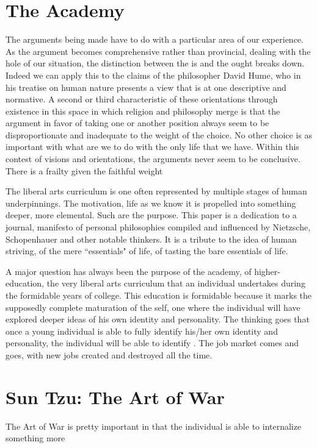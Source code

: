 \documentclass[12pt,letterpaper]{article}
\begin{document}
\section{The Academy}

The arguments being made have to do with a particular area of our experience.  As the argument becomes comprehensive rather than provincial, dealing with the hole of our situation, the distinction between the is and the ought breaks down.  Indeed we can apply this to the claims of the philosopher David Hume, who in his treatise on human nature presents a view that is at one descriptive and normative.  A second or third characteristic of these orientations through existence in this space in which religion and philosophy merge is that the argument in favor of taking one or another position always seem to be disproportionate and inadequate to the weight  of the choice.  No other choice is as important with what are we to do with the only life that we have.  Within this contest of visions and orientations, the arguments never seem to be conclusive.  There is a frailty given the faithful weight 


The liberal arts curriculum is one often represented by multiple stages of human underpinnings.  The motivation, life as we know it is propelled into something deeper, more elemental.  Such are the purpose.  This paper is a dedication to a journal, manifesto of personal philosophies compiled and influenced by Nietzsche, Schopenhauer and other notable thinkers.  It is a tribute to the idea of human striving, of the mere ``essentials" of life, of tasting the bare essentials of life.

A major question has always been the purpose of the academy, of higher-education, the very liberal arts curriculum that an individual undertakes during the formidable years of college.  This education is formidable because it marks the supposedly complete maturation of the self, one where the individual will have explored deeper ideas of his own identity and personality.  The thinking goes that once a young individual is able to fully identify his/her own identity and personality, the individual will be able to identify .  The job market comes and goes, with new jobs created and destroyed all the time.

\section{Sun Tzu: The Art of War}
The Art of War is pretty important in that the individual is able to internalize something more 
\end{document}
